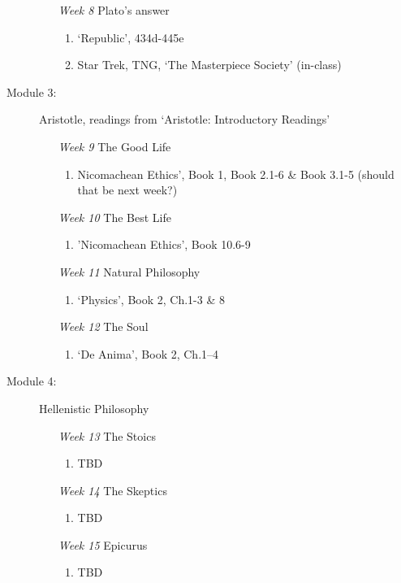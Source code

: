 \documentclass[article,oneside]{memoir}
\begin{document}
\begin{description}
\begin{enumerate}
\item[\textit{Week 8}] Plato's answer
\begin{enumerate}
\item `Republic', 434d-445e
\item Star Trek, TNG, `The Masterpiece Society' (in-class)
\end{enumerate}
\end{enumerate}

\item[Module 3:] Aristotle, readings from `Aristotle: Introductory Readings'
\begin{enumerate}
\item[\textit{Week 9}]  The Good Life
\begin{enumerate}
\item Nicomachean Ethics', Book 1, Book 2.1-6 \& Book 3.1-5 (should that be next week?)
\end{enumerate}
\item[ \textit{Week 10}] The Best Life
\begin{enumerate}
\item 'Nicomachean Ethics', Book 10.6-9
\end{enumerate}

\item[\textit{Week 11}] Natural Philosophy
\begin{enumerate}
\item `Physics', Book 2, Ch.1-3 \& 8
\end{enumerate}
\item[\textit{Week 12}] The Soul
\begin{enumerate}
\item `De Anima', Book 2, Ch.1--4
\end{enumerate}
\end{enumerate}

\item[Module 4:] Hellenistic Philosophy
\begin{enumerate} 
\item[ \textit{Week 13}] The Stoics
\begin{enumerate}
\item TBD
\end{enumerate}
\item[\textit{Week 14}] The Skeptics
\begin{enumerate}
 \item TBD
\end{enumerate}
\item[ \textit{Week 15}] Epicurus
\begin{enumerate}
\item TBD
\end{enumerate}
\end{enumerate}
\end{description}
\end{document}
